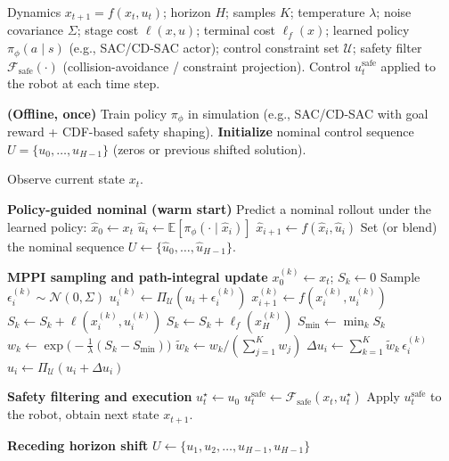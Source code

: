 
\begin{algorithm}[t]
\caption{PG-MPPI (Policy-Guided MPPI) for Safe Manipulator Planning}
\label{alg:pg-mppi}
\begin{algorithmic}[1]
\Require Dynamics $x_{t+1}=f(x_t,u_t)$; horizon $H$; samples $K$; temperature $\lambda$;
noise covariance $\Sigma$; stage cost $\ell(x,u)$; terminal cost $\ell_f(x)$;
learned policy $\pi_\phi(a\mid s)$ (e.g., SAC/CD-SAC actor); control constraint set $\mathcal U$;
safety filter $\mathcal F_{\text{safe}}(\cdot)$ (collision-avoidance / constraint projection).
\Ensure Control $u_t^{\text{safe}}$ applied to the robot at each time step.

\State \textbf{(Offline, once)} Train policy $\pi_\phi$ in simulation (e.g., SAC/CD-SAC with goal reward + CDF-based safety shaping).
\State \textbf{Initialize} nominal control sequence $U \!=\! \{u_0,\dots,u_{H-1}\}$ (zeros or previous shifted solution).

    \State Observe current state $x_t$.

    \Statex \textbf{Policy-guided nominal (warm start)}
    \State Predict a nominal rollout under the learned policy:
    \State \hspace{1em} $\hat x_0 \gets x_t$
        \State $\hat u_i \gets \mathbb E[\pi_\phi(\cdot\mid \hat x_i)]$ 
        \State $\hat x_{i+1} \gets f(\hat x_i,\hat u_i)$
    \EndFor
    \State Set (or blend) the nominal sequence $U \gets \{\hat u_0,\dots,\hat u_{H-1}\}$.

    \Statex \textbf{MPPI sampling and path-integral update}
        \State $x_0^{(k)}\gets x_t$; $S_k\gets 0$
            \State Sample $\epsilon_i^{(k)}\sim\mathcal N(0,\Sigma)$
            \State $u_i^{(k)}\gets \Pi_{\mathcal U}(u_i+\epsilon_i^{(k)})$ 
            \State $x_{i+1}^{(k)}\gets f(x_i^{(k)},u_i^{(k)})$
            \State $S_k\gets S_k + \ell(x_i^{(k)},u_i^{(k)})$
        \EndFor
        \State $S_k\gets S_k + \ell_f(x_H^{(k)})$
    \EndFor
    \State $S_{\min}\gets\min_k S_k$
        \State $w_k\gets\exp\big(-\frac{1}{\lambda}(S_k-S_{\min})\big)$
    \EndFor
    \State $\tilde w_k\gets w_k/(\sum_{j=1}^{K} w_j)$ 
        \State $\Delta u_i\gets \sum_{k=1}^{K} \tilde w_k\,\epsilon_i^{(k)}$
        \State $u_i\gets \Pi_{\mathcal U}(u_i+\Delta u_i)$
    \EndFor

    \Statex \textbf{Safety filtering and execution}
    \State $u_t^\star \gets u_0$
    \State $u_t^{\text{safe}} \gets \mathcal F_{\text{safe}}(x_t, u_t^\star)$ 
    \State Apply $u_t^{\text{safe}}$ to the robot, obtain next state $x_{t+1}$.

    \Statex \textbf{Receding horizon shift}
    \State $U \gets \{u_1,u_2,\dots,u_{H-1}, u_{H-1}\}$ 
\EndFor
\end{algorithmic}
\end{algorithm}